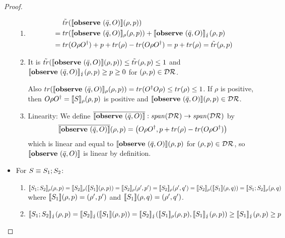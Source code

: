 \documentclass[a4paper,UKenglish,cleveref, autoref, thm-restate]{lipics-v2021}
\begin{document}
\begin{proof}
\begin{itemize}
\begin{enumerate}
            \item \begin{align*}
                &\phantom{=.}\tilde{tr}(\llbracket \mathbf{observe } \text{ }(\Bar{q},O) \rrbracket(\rho,p)) \\
                &= tr(\llbracket \mathbf{observe } \text{ }(\Bar{q},O) \rrbracket_{\rho} (\rho,p))+ \llbracket  \mathbf{observe } \text{ }(\Bar{q},O) \rrbracket_{\lightning} (\rho,p) \\
                &= tr(O \rho O^\dagger) + p+ tr(\rho)-tr(O\rho O^\dagger) = p+ tr(\rho) = \tilde{tr}(\rho,p)
            \end{align*}

            \item It is $\tilde{tr}(\llbracket \mathbf{observe } \text{ }(\Bar{q},O) \rrbracket(\rho,p))\leq \tilde{tr}(\rho,p)\leq 1$ and $ \llbracket \mathbf{observe } \text{ }(\Bar{q},O) \rrbracket_{\lightning}(\rho,p)\geq p \geq 0$ for $(\rho,p) \in \mathcal{D}\mathcal{R}$.

            Also $tr(\llbracket \mathbf{observe } \text{ }(\Bar{q},O) \rrbracket_{\rho}(\rho,p)) = tr(O^\dagger O\rho ) \leq tr(\rho)\leq 1$. If $\rho$ is positive, then $O \rho O^\dagger = \llbracket S \rrbracket_{\rho}(\rho,p)$ is positive and $\llbracket \mathbf{observe } \text{ }(\Bar{q},O) \rrbracket(\rho,p) \in \mathcal{D}\mathcal{R}$.

            \item Linearity:
            We define $\overline{\llbracket \mathbf{observe } \text{ }(\Bar{q},O) \rrbracket}: \mathit{span}(\mathcal{D}\mathcal{R}) \to \mathit{span}(\mathcal{D}\mathcal{R})$ by
            \begin{equation*}
                \overline{\llbracket \mathbf{observe } \text{ }(\Bar{q},O) \rrbracket}(\rho,p)=\left(O \rho O^\dagger, p + tr(\rho)-tr(O \rho O^\dagger)\right)
            \end{equation*}
            which is linear and equal to $\llbracket \mathbf{observe } \text{ }(\Bar{q},O) \rrbracket(\rho,p)$ for $(\rho,p) \in \mathcal{D}\mathcal{R}$, so $\llbracket \mathbf{observe } \text{ }(\Bar{q},O) \rrbracket$ is linear by definition.
        \end{enumerate}
        \item For $S \equiv S_1;S_2$:
        \begin{enumerate}
            \item $\llbracket S_1;S_2 \rrbracket_{\rho}(\rho,p) =\llbracket S_2 \rrbracket_{\rho} (\llbracket S_1 \rrbracket (\rho,p ) )
            = \llbracket S_2 \rrbracket_{\rho}(\rho',p')
            = \llbracket S_2 \rrbracket_{\rho}(\rho',q')
            = \llbracket S_2 \rrbracket_{\rho}(\llbracket S_1 \rrbracket(\rho,q)) =\llbracket S_1;S_2 \rrbracket_{\rho}(\rho,q)$
            where $\llbracket S_1 \rrbracket(\rho,p)=(\rho',p')$ and $\llbracket S_1 \rrbracket(\rho,q) = (\rho',q')$.

            \item $\llbracket S_1;S_2 \rrbracket_{\lightning}(\rho,p)
                = \llbracket S_2 \rrbracket_{\lightning}(\llbracket S_1 \rrbracket(\rho,p))
                = \llbracket S_2 \rrbracket_{\lightning}(\llbracket S_1 \rrbracket_{\rho}(\rho,p), \llbracket S_1 \rrbracket_{\lightning}(\rho,p))
                \geq  \llbracket S_1 \rrbracket_{\lightning}(\rho,p)\geq p$


\end{enumerate}
\end{itemize}
\end{proof}
\end{document}
